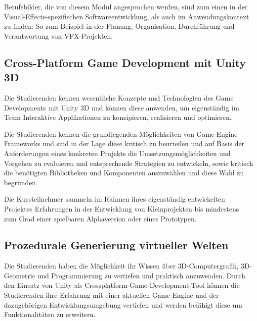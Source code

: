Berufsbilder, die von diesem Modul angesprochen werden, sind zum einen
in der Visual-Effects-spezifischen Softwareentwicklung, als auch im
Anwendungskontext zu finden: So zum Beispiel in der Planung,
Organisation, Durchführung und Verantwortung von VFX-Projekten.

\subsection*{Cross-Platform Game Development mit Unity
3D\label{/mi-2017/modulbeschreibungen-bachelor/BA_Vertiefung-Visual-Computing}}\label{cross-platform-game-development-mit-unity-3dpathlabelmi-2017modulbeschreibungen-bachelorbaux5fvertiefung-visual-computing}

Die Studierenden kennen wesentliche Konzepte und Technologien des Game
Developments mit Unity 3D und können diese anwenden, um eigenständig im
Team Interaktive Applikationen zu konzipieren, realisieren und
optimieren.

Die Studierenden kennen die grundlegenden Möglichkeiten von Game Engine
Frameworks und sind in der Lage diese kritisch zu beurteilen und auf
Basis der Anforderungen eines konkreten Projekts die
Umsetzungsmöglichkeiten und Vorgehen zu evaluieren und entsprechende
Strategien zu entwickeln, sowie kritisch die benötigten Bibliotheken und
Komponenten auszuwählen und diese Wahl zu begründen.

Die Kursteilnehmer sammeln im Rahmen ihres eigenständig entwickelten
Projektes Erfahrungen in der Entwicklung von Kleinprojekten bis
mindestens zum Grad einer spielbaren Alphaversion oder eines Prototypen.

\subsection*{Prozedurale Generierung virtueller
Welten\label{/mi-2017/modulbeschreibungen-bachelor/BA_Vertiefung-Visual-Computing}}\label{prozedurale-generierung-virtueller-weltenpathlabelmi-2017modulbeschreibungen-bachelorbaux5fvertiefung-visual-computing-1}

Die Studierenden haben die Möglichkeit ihr Wissen über
3D-Computergrafik, 3D-Geometrie und Programmierung zu vertiefen und
praktisch anzuwenden. Durch den Einsatz von Unity als
Crossplatform-Game-Development-Tool können die Studierenden ihre
Erfahrung mit einer aktuellen Game-Engine und der dazugehörigen
Entwicklungsumgebung vertiefen und werden befähigt diese um
Funktionalitäten zu erweitern.

